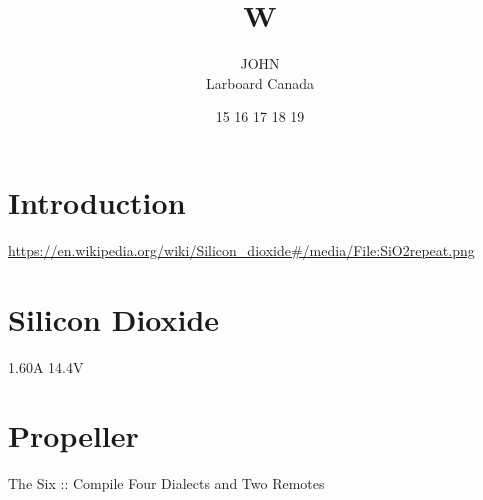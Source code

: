 \documentclass{article}
\title{W}
\author{
  \parbox{0.3\linewidth}{\centering JOHN\\Larboard Canada}
  }
\date{15 16 17 18 19}
\begin{document}
\maketitle

\section{Introduction}
\url{https://en.wikipedia.org/wiki/Silicon_dioxide#/media/File:SiO2repeat.png}

\section{Silicon Dioxide}
1.60A 14.4V

\section{Propeller}
The Six :: Compile Four Dialects and Two Remotes



\end{document}
